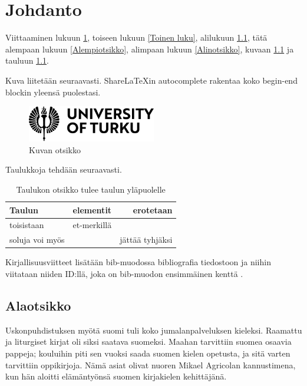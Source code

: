 \chapter{Johdanto} \label{Johdanto}

Viittaaminen lukuun \ref{Johdanto}, toiseen lukuun \ref{Toinen luku},
alilukuun \ref{Alaotsikko}, tätä alempaan lukuun \ref{Alempiotsikko},
alimpaan lukuun \ref{Alinotsikko}, kuvaan \ref{Kuvaesimerkki} ja
tauluun \ref{tab:Taulukon-otsikko-tulee}.

Kuva liitetään seuraavasti. ShareLaTeXin autocomplete rakentaa koko
begin-end blockin yleensä puolestasi.

\begin{figure}[H]
\centering \includegraphics[width=0.5\textwidth]{kuvat/utulogoen}
\caption{Kuvan otsikko}
\label{Kuvaesimerkki} 
\end{figure}

Taulukkoja tehdään seuraavasti.

\begin{table}[H]
\centering{}\caption{Taulukon otsikko tulee taulun yläpuolelle\label{tab:Taulukon-otsikko-tulee}}
\begin{tabular}{l|c|r|}
Taulun  & elementit  & erotetaan \tabularnewline
\hline 
toisistaan  & et-merkillä  & \tabularnewline
soluja voi myös  &  & jättää tyhjäksi \tabularnewline
\end{tabular}
\end{table}

Kirjallisuusviitteet lisätään bib-muodossa bibliografia tiedostoon
ja niihin viitataan niiden ID:llä, joka on bib-muodon ensimmäinen
kenttä \cite{crawley2007write}.

\section{Alaotsikko}

\label{Alaotsikko}

Uskonpuhdistuksen myötä suomi tuli koko jumalanpalveluksen kieleksi.
Raamattu ja liturgiset kirjat oli siksi saatava suomeksi. Maahan tarvittiin
suomea osaavia pappeja; kouluihin piti sen vuoksi saada suomen kielen
opetusta, ja sitä varten tarvittiin oppikirjoja. Nämä asiat olivat
nuoren Mikael Agricolan kannustimena, kun hän aloitti elämäntyönsä
suomen kirjakielen kehittäjänä.

